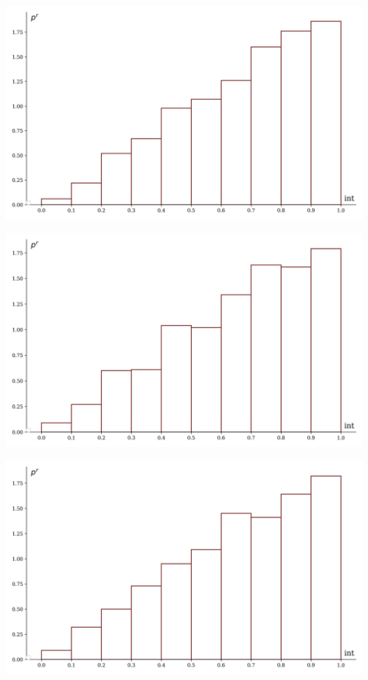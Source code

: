 \documentclass[a4paper, 14pt]{extarticle}
\begin{document}
\begin{minipage}[t]{0.25\textwidth}
\includegraphics[width=\textwidth, height=\textheight, keepaspectratio]{sample17_hist}
\end{minipage}%
\begin{minipage}[t]{0.25\textwidth}
\includegraphics[width=\textwidth, height=\textheight, keepaspectratio]{sample18_hist}
\end{minipage}%
\begin{minipage}[t]{0.25\textwidth}
\includegraphics[width=\textwidth, height=\textheight, keepaspectratio]{sample19_hist}
\end{minipage}%
\end{document}
